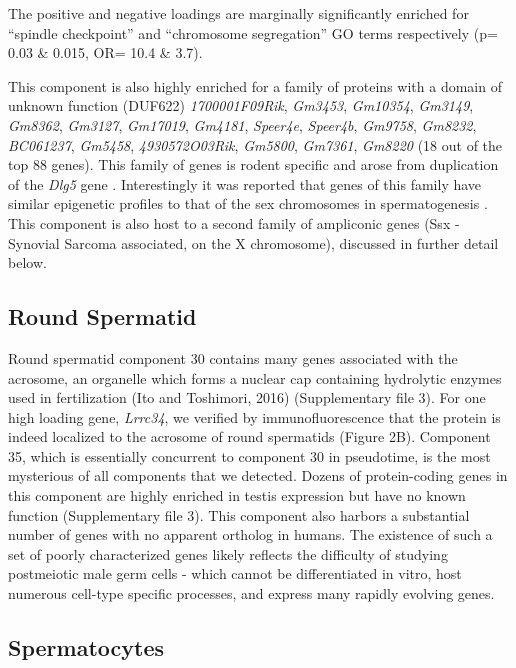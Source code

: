 The positive and negative loadings are marginally significantly enriched for ``spindle checkpoint'' and ``chromosome segregation'' GO terms respectively (p= 0.03 \& 0.015, OR= 10.4 \& 3.7).

This component is also highly enriched for a family of proteins with a domain of unknown function (DUF622) \textit{1700001F09Rik}, \textit{Gm3453}, \textit{Gm10354}, \textit{Gm3149}, \textit{Gm8362}, \textit{Gm3127}, \textit{Gm17019}, \textit{Gm4181}, \textit{Speer4e}, \textit{Speer4b}, \textit{Gm9758}, \textit{Gm8232}, \textit{BC061237}, \textit{Gm5458}, \textit{4930572O03Rik}, \textit{Gm5800}, \textit{Gm7361}, \textit{Gm8220} (18 out of the top 88 genes). This family of genes is rodent specific and arose from duplication of the \textit{Dlg5} gene \parencite{Church2009Lineagespecific}. Interestingly it was reported that genes of this family have similar epigenetic profiles to that of the sex chromosomes in spermatogenesis \parencite{Moretti2016Expression}. This component is also host to a second family of ampliconic genes (Ssx - Synovial Sarcoma associated, on the X chromosome), discussed in further detail below.

\subsection{Round Spermatid}
Round spermatid component 30 contains many genes associated with the acrosome, an organelle which forms a nuclear cap containing hydrolytic enzymes used in fertilization (Ito and Toshimori, 2016) (Supplementary file 3). For one high loading gene, \textit{Lrrc34}, we verified by immunofluorescence that the protein is indeed localized to the acrosome of round spermatids (Figure 2B). Component 35, which is essentially concurrent to component 30 in pseudotime, is the most mysterious of all components that we detected. Dozens of protein-coding genes in this component are highly enriched in testis expression but have no known function (Supplementary file 3). This component also harbors a substantial number of genes with no apparent ortholog in humans. The existence of such a set of poorly characterized genes likely reflects the difficulty of studying postmeiotic male germ cells - which cannot be differentiated in vitro, host numerous cell-type specific processes, and express many rapidly evolving genes.

\subsection{Spermatocytes}


